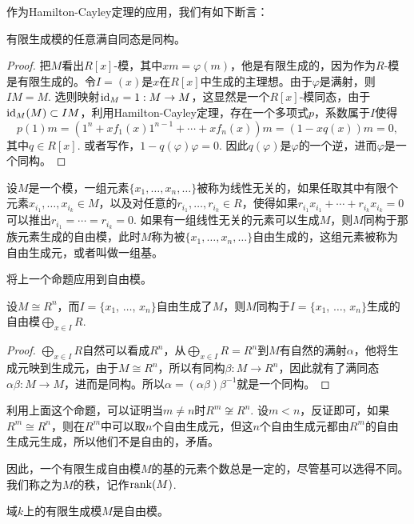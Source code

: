 作为Hamilton-Cayley定理的应用，我们有如下断言：

\begin{pro}
	有限生成模的任意满自同态是同构。
\end{pro}

\begin{proof}
	把$M$看出$R[x]$-模，其中$xm=\varphi(m)$，他是有限生成的，因为作为$R$-模是有限生成的。令$I=(x)$是$x$在$R[x]$中生成的主理想。由于$\varphi$是满射，则$IM=M$. 选则映射$\operatorname{id}_M=1:M\to M$，这显然是一个$R[x]$-模同态，由于$\operatorname{id}_M(M)\subset IM$，利用Hamilton-Cayley定理，存在一个多项式$p$，系数属于$I$使得
	\[
	p(1)m=\left(1^n+xf_1(x)1^{n-1}+\cdots+xf_n(x)\right)m=(1-xq(x))m=0,
	\]
	其中$q\in R[x]$. 或者写作，$1-q(\varphi)\varphi=0$. 因此$q(\varphi)$是$\varphi$的一个逆，进而$\varphi$是一个同构。
\end{proof}

\para 设$M$是一个模，一组元素$\{x_1,\dots, x_n, \dots\}$被称为线性无关的，如果任取其中有限个元素$x_{i_1},\dots,x_{i_k}\in M$，以及对任意的$r_{i_1},\dots,r_{i_k}\in R$，使得如果$r_{i_1}x_{i_1}+\cdots+r_{i_k}x_{i_k}=0$可以推出$r_{i_1}=\cdots=r_{i_k}=0$. 如果有一组线性无关的元素可以生成$M$，则$M$同构于那族元素生成的自由模，此时$M$称为被$\{x_1,\dots,x_n,\dots\}$自由生成的，这组元素被称为自由生成元，或者叫做一组基。\endpara

将上一个命题应用到自由模。

\begin{pro}
	设$M\cong R^n$，而$I=\{x_1$, $\dots$, $x_n\}$自由生成了$M$，则$M$同构于$I=\{x_1$, $\dots$, $x_n\}$生成的自由模$\bigoplus_{x\in I} R$.
\end{pro}

\begin{proof}
	$\bigoplus_{x\in I} R$自然可以看成$R^n$，从$\bigoplus_{x\in I} R=R^n$到$M$有自然的满射$\alpha$，他将生成元映到生成元，由于$M\cong R^n$，所以有同构$\beta:M\to R^n$，因此就有了满同态$\alpha\beta:M\to M$，进而是同构。所以$\alpha =(\alpha\beta)\beta^{-1}$就是一个同构。
\end{proof}

利用上面这个命题，可以证明当$m\neq n$时$R^m\not\cong R^n$. 设$m<n$，反证即可，如果$R^m\cong R^n$，则在$R^m$中可以取$n$个自由生成元，但这$n$个自由生成元都由$R^m$的自由生成元生成，所以他们不是自由的，矛盾。

因此，一个有限生成自由模$M$的基的元素个数总是一定的，尽管基可以选得不同。我们称之为$M$的秩，记作$\operatorname{rank}(M)$.

\begin{pro}
	域$k$上的有限生成模$M$是自由模。
\end{pro}


